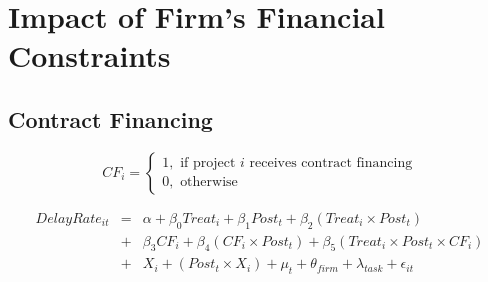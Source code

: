 \documentclass[
]{article}
\begin{document}
\hypertarget{impact-of-firms-financial-constraints}{%
\section{Impact of Firm's Financial
Constraints}\label{impact-of-firms-financial-constraints}}

\hypertarget{contract-financing}{%
\subsection{Contract Financing}\label{contract-financing}}

\[ CF_i = \begin{cases} 1, \text{ if project } i \text{ receives contract financing}\\
0, \text{ otherwise} \end{cases}\]

\[ \begin{aligned}
DelayRate_{it} &=& \alpha+\beta_0 Treat_i + \beta_1 Post_t + \beta_2 (Treat_i \times Post_t) \\
&+&\beta_3 CF_i + \beta_4 (CF_i \times Post_t) + \beta_5 (Treat_i \times Post_t \times CF_i) \\ 
&+&X_i + (Post_t \times X_i) + \mu_t + \theta_{firm} + \lambda_{task}+ \epsilon_{it}
\end{aligned}\]
\end{document}
